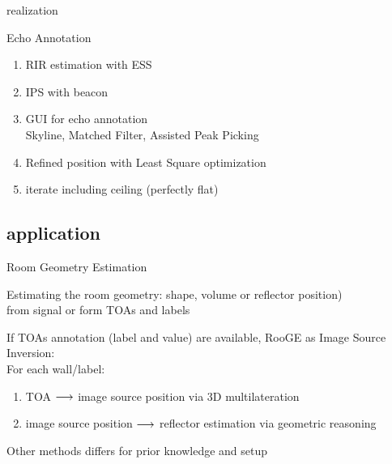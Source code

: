 \begin{frame}[t]{\dechorate realization}
    \begin{block}{Echo Annotation}
        \begin{enumerate}
            \item RIR estimation with ESS~\cite{Farina}
            \item IPS with beacon
            \item GUI for echo annotation
            \\Skyline, Matched Filter, Assisted Peak Picking
            \item Refined position with Least Square optimization
            \item iterate including ceiling (perfectly flat)
        \end{enumerate}
    \end{block}

    \vfill
\end{frame}

\subsection{application}



\begin{frame}[t]{Room Geometry Estimation}

    \begin{block}{}
        Estimating the room geometry: shape, volume or reflector position)
        \\from signal or form TOAs and labels
    \end{block}
    \vfill

    \begin{block}{}
        If TOAs annotation (label and value) are available, RooGE as \alert{Image Source Inversion}:
        \\For each wall/label:
        \begin{enumerate}
            \item TOA $\longrightarrow$ image source position via 3D multilateration
            \item image source position $\longrightarrow$ reflector estimation via geometric reasoning
        \end{enumerate}
    \end{block}

    \vfill
    Other methods differs for prior knowledge and setup~\cite{Crocco,Antonacci,Filos}

    \vfill

\end{frame}


